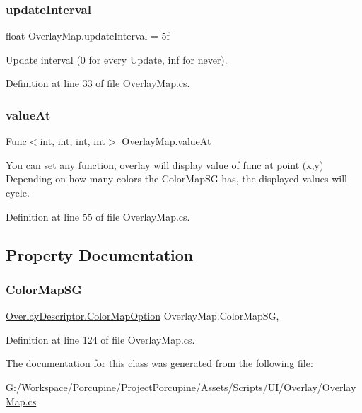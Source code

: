 \subsubsection{\texorpdfstring{update\+Interval}{updateInterval}}
{\footnotesize\ttfamily float Overlay\+Map.\+update\+Interval = 5f}



Update interval (0 for every Update, inf for never). 



Definition at line 33 of file Overlay\+Map.\+cs.

\mbox{\label{class_overlay_map_a088245c64083beb9fe5f8c26e0c0d125}} 
\subsubsection{\texorpdfstring{value\+At}{valueAt}}
{\footnotesize\ttfamily Func$<$int, int, int, int$>$ Overlay\+Map.\+value\+At}



You can set any function, overlay will display value of func at point (x,y) Depending on how many colors the Color\+Map\+SG has, the displayed values will cycle. 



Definition at line 55 of file Overlay\+Map.\+cs.



\subsection{Property Documentation}
\mbox{\label{class_overlay_map_a5ecbeb0754f09284f3142a3b8f1f127f}} 
\subsubsection{\texorpdfstring{Color\+Map\+SG}{ColorMapSG}}
{\footnotesize\ttfamily \hyperlink{class_overlay_descriptor_ace98995d8c49c9395934100f3e5e1240}{Overlay\+Descriptor.\+Color\+Map\+Option} Overlay\+Map.\+Color\+Map\+SG\hspace{0.3cm}{\ttfamily [get]}, {\ttfamily [set]}}



Definition at line 124 of file Overlay\+Map.\+cs.



The documentation for this class was generated from the following file\+:\begin{DoxyCompactItemize}
\item 
G\+:/\+Workspace/\+Porcupine/\+Project\+Porcupine/\+Assets/\+Scripts/\+U\+I/\+Overlay/\hyperlink{_overlay_map_8cs}{Overlay\+Map.\+cs}\end{DoxyCompactItemize}
